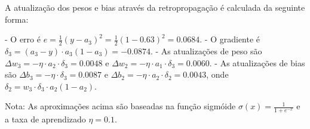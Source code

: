 \documentclass[12pt,a4paper, brazil]{article}
\begin{document}
\begin{enumerate}
   A atualização dos pesos e bias através da retropropagação é calculada da seguinte forma:

   - O erro é $e = \frac{1}{2}(y - a_3)^2 = \frac{1}{2}(1 - 0.63)^2 = 0.0684$.
   - O gradiente é $\delta_3 = (a_3 - y) \cdot a_3(1 - a_3) = -0.0874$.
   - As atualizações de peso são $\Delta w_3 = -\eta \cdot a_2 \cdot \delta_3 = 0.0048$ e $\Delta w_2 = -\eta \cdot a_1 \cdot \delta_3 = 0.0060$.
   - As atualizações de bias são $\Delta b_3 = -\eta \cdot \delta_3 = 0.0087$ e $\Delta b_2 = -\eta \cdot a_2 \cdot \delta_2 = 0.0043$, onde $\delta_2 = w_3 \cdot \delta_3 \cdot a_2(1 - a_2)$.

   Nota: As aproximações acima são baseadas na função sigmóide $\sigma(x) = \frac{1}{1+e^{-x}}$ e a taxa de aprendizado $\eta = 0.1$.

  \end{enumerate}

   


\printbibliography
\end{document}
